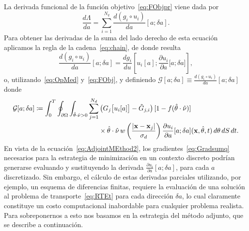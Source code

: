 La derivada funcional de la función objetivo~\eqref{eq:FObjpr} viene 
dada por
\begin{equation}
  \frac{d \Lambda}{da} = \sum_{i=1}^{N_q} \frac{d (g_i\circ
    u_i)}{da}[a;\delta a].
\label{eq:Gradsumq}
\end{equation}
Para obtener las derivadas de la suma del lado derecho 
de esta ecuación aplicamos la regla de la cadena~\eqref{eq:chain}, 
de donde resulta  
\begin{equation}
\frac{d (g_i\circ u_i)}{da}[a;\delta a] = \frac{d g_i}{
    d u}\left[u_i[a];\frac{\partial u_i}{\partial a} \big[a;\delta
    a\big]\right],
  \label{eq:AdjointMEthod}
\end{equation} 
o, utilizando~\eqref{eq:OpMed} y~\eqref{eq:FObj}, 
y definiendo $\mathcal{G}[a;\delta a] \equiv \frac{d (g_i\circ u_i)}{da}[a;\delta a]$ donde
\begin{equation}
\begin{split}
\begin{aligned}
  \mathcal{G}[a;\delta a]\coloneqq 
  \int_0^T \oint_{\partial \Omega} \int_{\hat{\theta} \cdot \hat{\nu}>0}
  \sum_{j=1}^{N_d} &\left( G_j\big[u_i[a]\big]-
    \tilde {G}_{j,i} \right) [1-f(\hat{\theta} \cdot \hat{\nu})]\\ 
   &\times \hat{\theta} \cdot \hat{\nu} \, w\left( \frac{ |\mathbf{x}-\mathbf{x}_j |}{\sigma_d}
  \right) \frac{\partial u_i}{\partial a}[a;\delta a](\mathbf{x},\hat{\theta},t)
 \, d\theta \, dS \, dt.
\end{aligned}
\end{split}
\label{eq:AdjointMEthod2}
\end{equation}
En vista de la ecuación~\eqref{eq:AdjointMEthod2}, 
los gradientes~\eqref{eq:Gradsumq} necesarios para la estrategia 
de minimización en un contexto discreto podrían generarse 
evaluando y sustituyendo la derivada 
$\frac{\partial u_i}{\partial a}[a;\delta a]$, para cada $a$ 
discretizado. 
Sin embargo, el cálculo de estas derivadas parciales utilizando, 
por ejemplo, un esquema de diferencias finitas, requiere la evaluación 
de una solución al problema de transporte~\eqref{eq:RTEt} para 
cada dirección $\delta a$, lo cual claramente constituye 
un costo computacional inabordable para cualquier problema realista. 
Para sobreponernos a esto nos basamos en la 
estrategia del método adjunto, que se describe a continuación.

